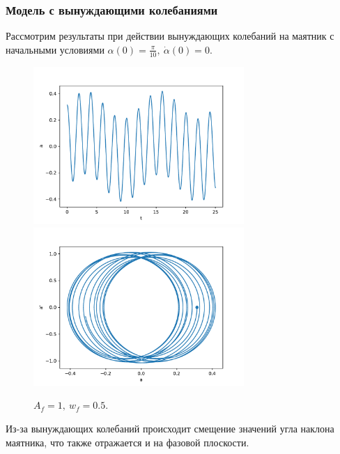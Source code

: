         \subsubsection{Модель с вынуждающими колебаниями}
            Рассмотрим результаты при действии вынуждающих колебаний на маятник с начальными условиями $\alpha(0) = \frac{\pi}{10}, ~ \dot{\alpha}(0) = 0$.
            \begin{figure}[H]
                \centering
                \includegraphics[width=8cm]{pictures/4resonance1.pdf}
                \includegraphics[width=8cm]{pictures/4resonance1p.pdf}
                \caption{$A_f = 1, ~ w_f = 0.5$.}
            \end{figure}
            Из-за вынуждающих колебаний происходит смещение значений угла наклона маятника, что также отражается и на фазовой плоскости.

